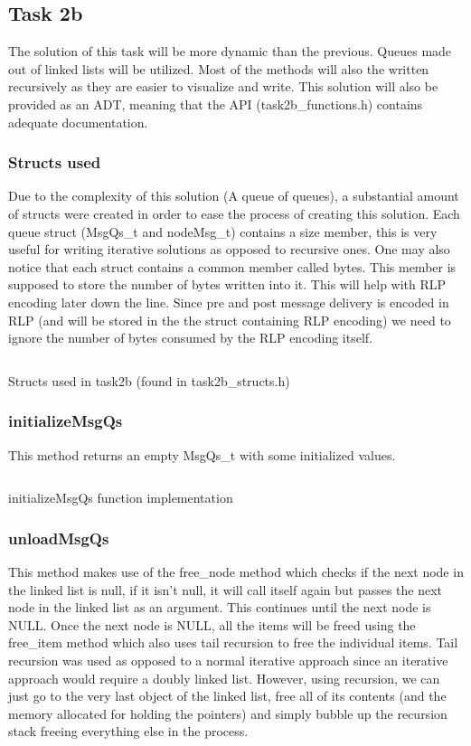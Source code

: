 \documentclass[a4paper, 12pt, titlepage]{article}
\newenvironment{code}{\captionsetup{type=listing}}{}
\newcommand{\sourcecode}[3]{
    \begin{code}
      \inputminted[linenos,numbersep=5pt,gobble=0,frame=lines,framesep=2mm,]{c}{#1}
        \caption{#2}
        \label{lst: #3}
    \end{code}
}
\begin{document}
\begin{onehalfspacing}
  \subsection{Task 2b}
  The solution of this task will be more dynamic than the previous. Queues made out of linked lists will be utilized. Most of the methods will also the written recursively as they are easier to visualize and write. This solution will also be provided as an ADT, meaning that the API (task2b\_functions.h) contains adequate documentation.

  \subsubsection{Structs used}

  Due to the complexity of  this solution (A queue of queues), a substantial amount of structs were created in order to ease the process of creating this solution. Each queue struct (MsgQs\_t and nodeMsg\_t) contains a size member, this is very useful for writing iterative solutions as opposed to recursive ones. One may also notice that each struct contains a common member called bytes. This member is supposed to store the  number of bytes written into it. This will help with RLP encoding later down the line. Since pre and post message delivery is encoded in RLP (and will be stored in the the struct containing RLP encoding) we need to ignore the number of bytes consumed by the RLP encoding itself.

  \sourcecode{snippets/task2b_structs.c}{Structs used in task2b (found in task2b_structs.h)}{task2b_structs}

  \subsubsection{initializeMsgQs}
  This method returns an empty MsgQs\_t with some initialized values.

  \sourcecode{snippets/task2b/initializeMsgQs.c}{initializeMsgQs function implementation}{task2b_initializeMsgQs}

    \subsubsection{unloadMsgQs}
  This method makes use of the free\_node method which checks if the next node in the linked list is null, if it isn't null, it will call itself again but passes the next node in the linked list as an argument. This continues until the next node is NULL. Once the next node is NULL, all the items will be freed using the free\_item method which also uses tail recursion to free the individual items. Tail recursion was used as opposed to a normal iterative approach since an iterative approach would require a doubly linked list. However, using recursion, we can just go to the very last object of the linked list, free all of its contents (and the memory allocated for holding the pointers) and simply bubble up the recursion stack freeing everything else in the process.


\end{onehalfspacing}
\end{document}
